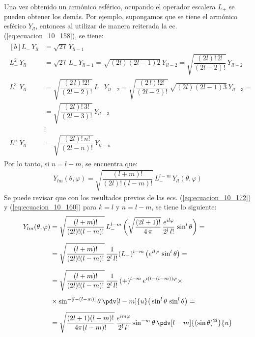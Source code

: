 Una vez obtenido un armónico esférico, ocupando el operador escalera $L_{\pm}$ se pueden obtener los demás. Por ejemplo, supongamos que se tiene el armónico esférico $Y_{ll}$, entonces al utilizar de manera reiterada la ec. (\ref{eq:ecuacion_10_158}), se tiene:
\begin{align}
\begin{aligned}[b]
L_{-} \, Y_{ll} &= \sqrt{2 \, l} \, Y_{ll-1} \\[0.5em]
L_{-}^{2} \, Y_{ll} &= \sqrt{2 \, l} \, L_{-} \, Y_{ll-1} = \sqrt{(2 l)(2 l - 1) 2} \, Y_{ll-2} = \sqrt{\dfrac{(2 l)! \, 2!}{(2 l - 2)!}} \, Y_{ll-2} \\[0.5em]
L_{-}^{3} \, Y_{ll} &= \sqrt{\dfrac{(2 \, l)! 2!}{(2 l - 2)!}} \, L_{-} \, Y_{ll-2} = \sqrt{\dfrac{(2 \, l)! 2!}{(2 l - 2)!}} \,\sqrt{(2 l)(2 l - 1) 3} \, Y_{ll-3} = \\[0.5em]
&= \sqrt{\dfrac{(2 l)! \, 3!}{(2 l - 3)!}} \, Y_{ll-3} \\[0.5em]
&\vdots \\[0.5em]
L_{-}^{n} \, Y_{ll} &= \sqrt{\dfrac{(2 l)! \, n!}{(2 l - n)!}} \, Y_{ll-n}
\end{aligned}
\label{eq:ecuacion_10_173}
\end{align}
Por lo tanto, si $n = l - m$, se encuentra que:
\begin{align}
Y_{lm} (\theta, \varphi) = \sqrt{\dfrac{(l + m)!}{(2 l)! (l - m)!}} \, L_{-}^{l-m} \, Y_{ll}(\theta, \varphi)
\label{eq:ecuacion_10_174}
\end{align}
Se puede revisar que con los resultados previos de las ecs. (\ref{eq:ecuacion_10_172}) y (\ref{eq:ecuacion_10_160}) para $k = l$ y $n = l - m$, se tiene lo siguiente:
\begin{align*}
Y_{lm}(\theta, \varphi) &= \sqrt{\dfrac{(l + m)!}{(2 l)! (l - m)!}} \, L_{-}^{l-m} \, \bigg( \sqrt{\dfrac{(2 l + 1)!}{4 \, \pi}} \, \dfrac{e^{i l \varphi}}{2^{l} \, l!} \, \sin^{l} \theta \bigg) = \\[0.5em]
&= \sqrt{\dfrac{(l + m)!}{(2 l)! (l - m)!}} \, \dfrac{1}{2^{l} \, l!} (L_{-})^{l-m} \, \big( e^{i l \varphi} \, \sin^{l} \theta \big) = \\[0.5em]
&= \sqrt{\dfrac{(l + m)!}{(2 l)! (l - m)!}} \, \dfrac{1}{2^{l} \, l!} \, (+)^{l-m} \, e^{i(l-(l-m))\varphi} \times \\[0.5em]
&\times \sin^{-[l-(l-m)]} \theta \, \pdv[l-m]{u} \big( \sin^{l} \theta \, \sin^{l} \theta \big) = \\[0.5em]
&= \sqrt{\dfrac{(2 l + 1)(l + m)!}{4 \pi (l -m)!}} \, \dfrac{e^{i m \varphi}}{2^{l} \, l!} \sin^{-m} \theta \, \pdv[l-m]{(\sin \theta)^{2l}}{u} 
\end{align*}
